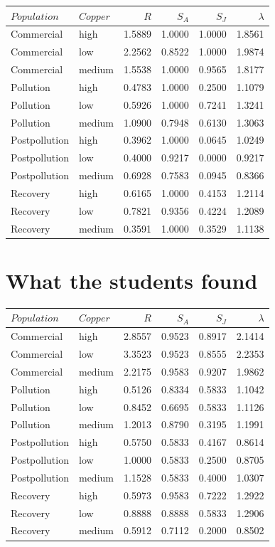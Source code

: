 \documentclass{article}\usepackage[]{graphicx}\usepackage[]{color}
\begin{document}
{\footnotesize
\begin{tabular}{llrrrr}
  \toprule 
 $Population$ & $Copper$ & $R$ & $S_A$ & $S_J$ & $\lambda$\\
 \midrule 
 Commercial & high & 1.5889 & 1.0000 & 1.0000 & 1.8561 \\ 
  Commercial & low & 2.2562 & 0.8522 & 1.0000 & 1.9874 \\ 
  Commercial & medium & 1.5538 & 1.0000 & 0.9565 & 1.8177 \\ 
  Pollution & high & 0.4783 & 1.0000 & 0.2500 & 1.1079 \\ 
  Pollution & low & 0.5926 & 1.0000 & 0.7241 & 1.3241 \\ 
  Pollution & medium & 1.0900 & 0.7948 & 0.6130 & 1.3063 \\ 
  Postpollution & high & 0.3962 & 1.0000 & 0.0645 & 1.0249 \\ 
  Postpollution & low & 0.4000 & 0.9217 & 0.0000 & 0.9217 \\ 
  Postpollution & medium & 0.6928 & 0.7583 & 0.0945 & 0.8366 \\ 
  Recovery & high & 0.6165 & 1.0000 & 0.4153 & 1.2114 \\ 
  Recovery & low & 0.7821 & 0.9356 & 0.4224 & 1.2089 \\ 
  Recovery & medium & 0.3591 & 1.0000 & 0.3529 & 1.1138 \\ 
   \bottomrule 
\end{tabular}
}


\section{What the students found}
{\footnotesize
\begin{tabular}{llrrrr}
  \toprule 
 $Population$ & $Copper$ & $R$ & $S_A$ & $S_J$ & $\lambda$\\
 \midrule 
 Commercial & high & 2.8557 & 0.9523 & 0.8917 & 2.1414 \\ 
  Commercial & low & 3.3523 & 0.9523 & 0.8555 & 2.2353 \\ 
  Commercial & medium & 2.2175 & 0.9583 & 0.9207 & 1.9862 \\ 
  Pollution & high & 0.5126 & 0.8334 & 0.5833 & 1.1042 \\ 
  Pollution & low & 0.8452 & 0.6695 & 0.5833 & 1.1126 \\ 
  Pollution & medium & 1.2013 & 0.8790 & 0.3195 & 1.1991 \\ 
  Postpollution & high & 0.5750 & 0.5833 & 0.4167 & 0.8614 \\ 
  Postpollution & low & 1.0000 & 0.5833 & 0.2500 & 0.8705 \\ 
  Postpollution & medium & 1.1528 & 0.5833 & 0.4000 & 1.0307 \\ 
  Recovery & high & 0.5973 & 0.9583 & 0.7222 & 1.2922 \\ 
  Recovery & low & 0.8888 & 0.8888 & 0.5833 & 1.2906 \\ 
  Recovery & medium & 0.5912 & 0.7112 & 0.2000 & 0.8502 \\ 
   \bottomrule 
\end{tabular}
}
\end{document}
